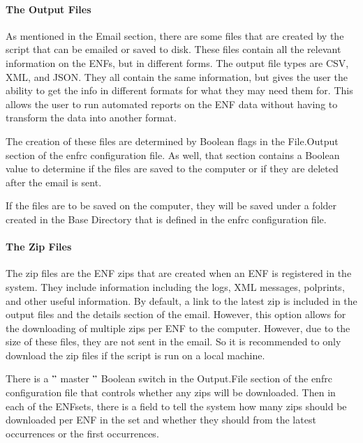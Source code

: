 \documentclass[a4paper,12pt]{report}
\begin{document}


\vspace{12pt}
 \par
\paragraph*{The Output Files}
 \par
As mentioned in the Email section, there are some files that are created by the script that can be emailed or saved to disk. These files contain all the relevant information on the ENFs, but in different forms. The output file types are CSV, XML, and JSON. They all contain the same information, but gives the user the ability to get the info in different formats for what they may need them for. This allows the user to run automated reports on the ENF data without having to transform the data into another format. \par
The creation of these files are determined by Boolean flags in the File.Output section of the enfrc configuration file. As well, that section contains a Boolean value to determine if the files are saved to the computer or if they are deleted after the email is sent. \par
If the files are to be saved on the computer, they will be saved under a folder created in the Base Directory that is defined in the enfrc configuration file. \par
\paragraph*{The Zip Files}
 \par
The zip files are the ENF zips that are created when an ENF is registered in the system. They include information including the logs, XML messages, polprints, and other useful information. By default, a link to the latest zip is included in the output files and the details section of the email. However, this option allows for the downloading of multiple zips per ENF to the computer. However, due to the size of these files, they are not sent in the email. So it is recommended to only download the zip files if the script is run on a local machine. \par
There is a  $ " $ master $ " $  Boolean switch in the Output.File section of the enfrc configuration file that controls whether any zips will be downloaded. Then in each of the ENFsets, there is a field to tell the system how many zips should be downloaded per ENF in the set and whether they should from the latest occurrences or the first occurrences. \par
\end{document}
